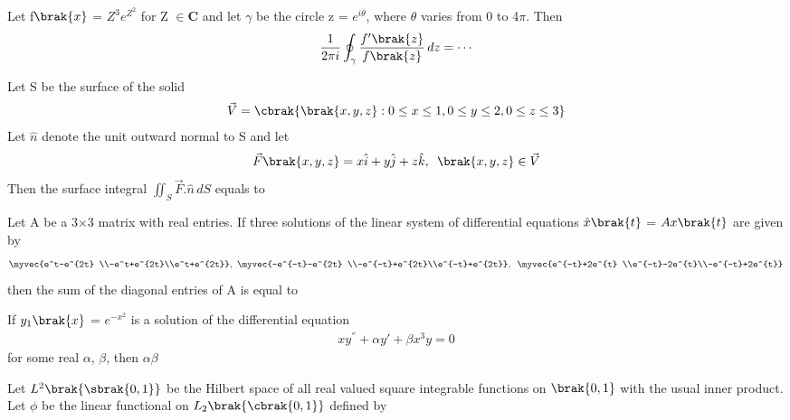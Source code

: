 \iffalse
\title{Assignment}
\author{EE24BTECH11038}
\section{ma}
\chapter{2018}
\fi
\item Let f$\brak{x}$ = $Z^3e^{Z^{2}}$ for Z $\in \mathbf{C}$ and let $\gamma$ be the circle z = $e^{i\theta}$, where $\theta$ varies from 0 to 4$\pi$. Then
\begin{align*}
    \frac{1}{2\pi i}\oint_{\gamma} \frac{f'\brak{z}}{f\brak{z}}\,dz=\cdots
\end{align*}
\item Let S be the surface of the solid
\begin{align*}
    \vec{V}=\cbrak{\brak{x,y,z}:0\leq x \leq 1,0 \leq y \leq 2,0\leq z \leq 3}
\end{align*}
Let $\hat{n}$ denote the unit outward normal to S and let
\begin{align*}
    \vec{F}\brak{x,y,z}=x\hat{i}+y\hat{j}+z\hat{k},\,\,\, \brak{x,y,z}\in \vec{V}
\end{align*}
Then the surface integral $\iint_{S} \vec{F}.\hat{n}\,dS$ equals to
\item Let A be a 3$\times$3 matrix with real entries. If three solutions of the linear system of differential equations $\hat{x}\brak{t}$ = $Ax\brak{t}$ are given by
\begin{align*}
    \myvec{e^t-e^{2t} \\-e^t+e^{2t}\\e^t+e^{2t}} , \,\,   \myvec{-e^{-t}-e^{2t} \\-e^{-t}+e^{2t}\\e^{-t}+e^{2t}}, \,\,\, \myvec{e^{-t}+2e^{t} \\e^{-t}-2e^{t}\\-e^{-t}+2e^{t}}
\end{align*}
then the sum of the diagonal entries of A is equal to
\item If $y_1\brak{x}$ = $e^{-x^{2}}$ is a solution of the differential equation
\begin{align*}
    xy^{''}+\alpha y{'}+\beta x^3y=0
\end{align*}
for some real $\alpha$, $\beta$,  then $\alpha \beta$
\item Let $L^{2}\brak{\sbrak{0,1}}$ be the Hilbert space of all real valued square integrable functions on $\brak{0, 1}$ with the usual inner product. Let $\phi$ be the linear functional on $L_{2}\brak{\cbrak{0,1}}$ defined by

